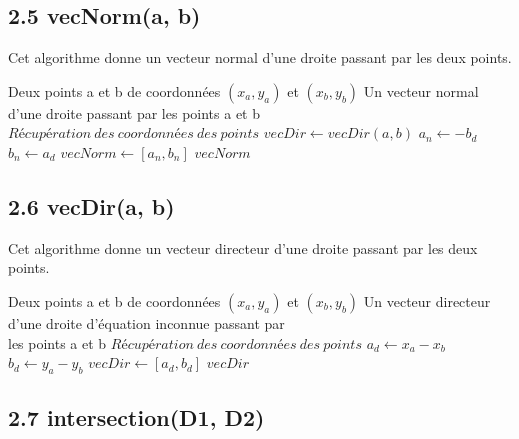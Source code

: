 \documentclass[a4paper,12pt]{report}	%
\begin{document}
	{\subsection*{2.5 vecNorm(a, b)}}
	
	\noindent Cet algorithme donne un vecteur normal d'une droite passant par les deux points.
	
	\begin{algorithm}
	\caption{$vecNorm(a, b)$}
	\label{Modele pour un algo}
	\begin{algorithmic} [1]
	\REQUIRE Deux points a et b de coordonnées $(x_{a}, y_{a})$ et $(x_{b}, y_{b})$
	\ENSURE Un vecteur normal d’une droite passant par les points a et b
	\STATE $Récupération\ des\ coordonnées\ des\ points$
	\STATE $ vecDir \gets vecDir(a, b) $
	\STATE $ a_{n} \gets -b_{d} $
	\STATE $ b_{n} \gets a_{d} $
	\STATE $ vecNorm \gets [a_{n}, b_{n}] $
	\RETURN $ vecNorm $
	\end{algorithmic}
	\end{algorithm}
	
		\newpage

	{\subsection*{2.6 vecDir(a, b)}}
	
	\noindent Cet algorithme donne un vecteur directeur d'une droite passant par les deux points.

	\begin{algorithm}
	\caption{$vecDir(a, b)$}
	\label{Modele pour un algo}
	\begin{algorithmic} [1]
	\REQUIRE Deux points a et b de coordonnées $(x_{a}, y_{a})$ et $(x_{b}, y_{b})$
	\ENSURE Un vecteur directeur d’une droite d'équation inconnue passant par \\les points a et b
	\STATE $Récupération\ des\ coordonnées\ des\ points$
	\STATE $ a_{d} \gets x_{a} - x_{b} $
	\STATE $ b_{d} \gets y_{a} - y_{b} $
	\STATE $ vecDir \gets [a_{d}, b_{d}] $
	\RETURN $ vecDir $
	\end{algorithmic}
	\end{algorithm}
		
	{\subsection*{2.7 intersection(D1, D2)}}
	
\end{document}
